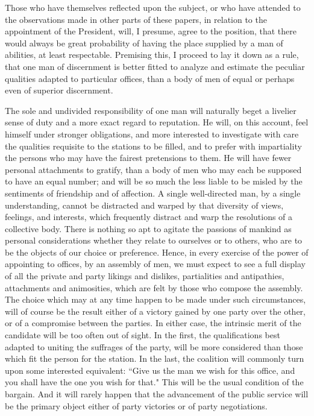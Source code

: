 Those who have themselves reflected upon the subject, or who have attended to the observations made in other parts of these papers, in relation to the appointment of the President, will, I presume, agree to the position, that there would always be great probability of having the place supplied by a man of abilities, at least respectable. Premising this, I proceed to lay it down as a rule, that one man of discernment is better fitted to analyze and estimate the peculiar qualities adapted to particular offices, than a body of men of equal or perhaps even of superior discernment.

The sole and undivided responsibility of one man will naturally beget a livelier sense of duty and a more exact regard to reputation. He will, on this account, feel himself under stronger obligations, and more interested to investigate with care the qualities requisite to the stations to be filled, and to prefer with impartiality the persons who may have the fairest pretensions to them. He will have fewer personal attachments to gratify, than a body of men who may each be supposed to have an equal number; and will be so much the less liable to be misled by the sentiments of friendship and of affection. A single well-directed man, by a single understanding, cannot be distracted and warped by that diversity of views, feelings, and interests, which frequently distract and warp the resolutions of a collective body. There is nothing so apt to agitate the passions of mankind as personal considerations whether they relate to ourselves or to others, who are to be the objects of our choice or preference. Hence, in every exercise of the power of appointing to offices, by an assembly of men, we must expect to see a full display of all the private and party likings and dislikes, partialities and antipathies, attachments and animosities, which are felt by those who compose the assembly. The choice which may at any time happen to be made under such circumstances, will of course be the result either of a victory gained by one party over the other, or of a compromise between the parties. In either case, the intrinsic merit of the candidate will be too often out of sight. In the first, the qualifications best adapted to uniting the suffrages of the party, will be more considered than those which fit the person for the station. In the last, the coalition will commonly turn upon some interested equivalent: ``Give us the man we wish for this office, and you shall have the one you wish for that." This will be the usual condition of the bargain. And it will rarely happen that the advancement of the public service will be the primary object either of party victories or of party negotiations.

